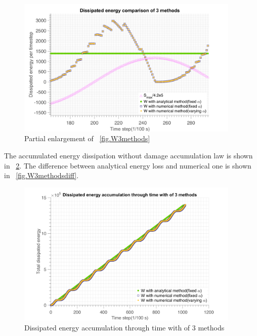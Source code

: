 \documentclass[3p,times,number,review]{elsarticle}
\newcommand{\figref}[1]{\figurename~\ref{#1}}
\begin{document}
\begin{figure}[!h]
	\centering
	\includegraphics[width=0.95\textwidth]{figures//W_3methods_enlarge.png} 
	\caption{Partial enlargement of \figref{fig.W3methods}}
	\label{fig.W3methodsenlarge}
\end{figure}
The accumulated energy dissipation without damage accumulation law is shown in \figref{fig.W3methods2}. The difference between analytical energy loss and numerical one is shown in \figref{fig.W3methodsdiff}.
\begin{figure}[!h]
	\centering
	\includegraphics[width=0.95\textwidth]{figures//W_3methods2.png} 
	\caption{Dissipated energy accumulation through time with of 3 methods}
	\label{fig.W3methods2}
\end{figure}
\end{document}
